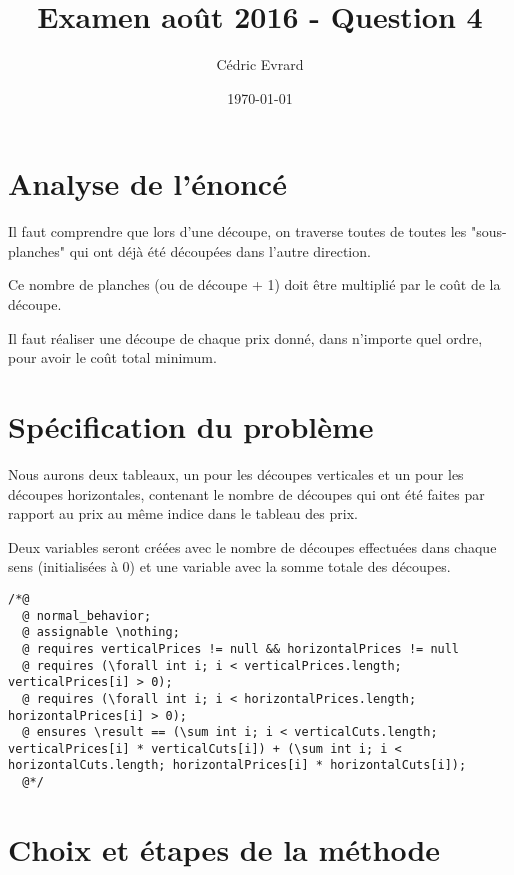 \documentclass[11pt]{article}
\begin{document}
\title{Examen août 2016 - Question 4}
\author{Cédric Evrard}
\date{\today}

\maketitle

\section{Analyse de l'énoncé}

Il faut comprendre que lors d'une découpe, on traverse toutes de toutes les "sous-planches" qui ont déjà été découpées dans l'autre direction.

Ce nombre de planches (ou de découpe + 1) doit être multiplié par le coût de la découpe.

Il faut réaliser une découpe de chaque prix donné, dans n'importe quel ordre, pour avoir le coût total minimum.

\section{Spécification du problème}

Nous aurons deux tableaux, un pour les découpes verticales et un pour les découpes horizontales, contenant le nombre de découpes qui ont été faites par rapport au prix au même indice dans le tableau des prix.

Deux variables seront créées avec le nombre de découpes effectuées dans chaque sens (initialisées à 0) et une variable avec la somme totale des découpes.

\begin{lstlisting}[caption=Spécification JML de la question 4, label={lst:pre_question4}]
/*@
  @ normal_behavior;
  @ assignable \nothing;
  @ requires verticalPrices != null && horizontalPrices != null
  @ requires (\forall int i; i < verticalPrices.length; verticalPrices[i] > 0);
  @ requires (\forall int i; i < horizontalPrices.length; horizontalPrices[i] > 0);
  @ ensures \result == (\sum int i; i < verticalCuts.length; verticalPrices[i] * verticalCuts[i]) + (\sum int i; i < horizontalCuts.length; horizontalPrices[i] * horizontalCuts[i]);
  @*/
\end{lstlisting}

\section{Choix et étapes de la méthode}
\end{document}
